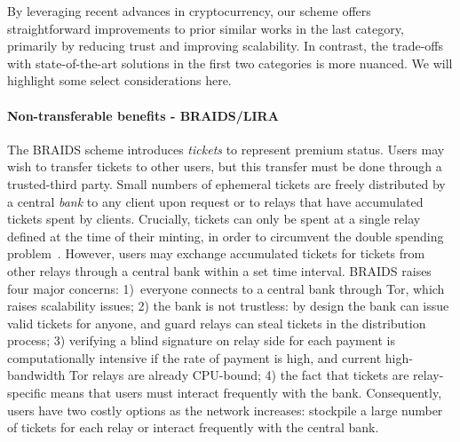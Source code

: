 

By leveraging recent advances in cryptocurrency, our scheme offers
straightforward improvements to prior similar works in the last category,
primarily by reducing trust and improving scalability. In contrast, the
trade-offs with state-of-the-art solutions in the first two categories is more
nuanced. We will highlight some select considerations here.

\paragraph*{Non-transferable benefits - BRAIDS/LIRA} The BRAIDS scheme
introduces \emph{tickets} to represent premium status. Users may wish to
transfer tickets to other users, but this transfer must be done through a
trusted-third party. Small numbers of ephemeral tickets are freely distributed
by a central \emph{bank} to any client upon request or to relays that have
accumulated tickets spent by clients. Crucially, tickets can only be spent at a
single relay defined at the time of their minting, in order to circumvent the
double spending problem~\cite{jansen2010recruiting}. However, users may exchange
accumulated tickets for tickets from other relays through a central bank within
a set time interval. BRAIDS raises four major concerns: 1)~everyone connects to
a central bank through Tor, which raises scalability issues; 2) the bank is not
trustless: by design the bank can issue valid tickets for anyone, and guard
relays can steal tickets in the distribution process; 3) verifying a blind
signature on relay side for each payment is computationally intensive if the
rate of payment is high, and current high-bandwidth Tor relays are already
CPU-bound; 4) the fact that tickets are relay-specific means that users must
interact frequently with the bank. Consequently, users have two costly options
as the network increases: stockpile a large number of tickets for each relay or
interact frequently with the central bank.

